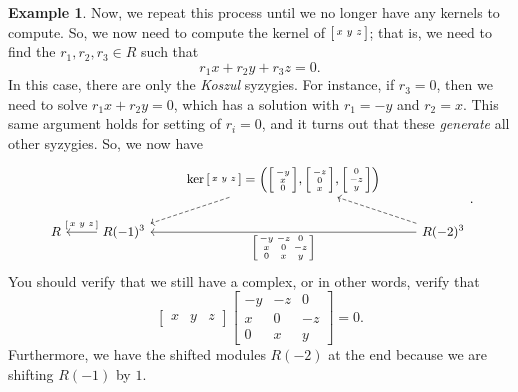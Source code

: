 \documentclass[12pt,a4paper]{article}
\theoremstyle{definition}
\newtheorem{example}[theorem]{Example}
\numberwithin{equation}{section}
\begin{document}
\begin{example}
    Now, we repeat this process until we no longer have any kernels to compute.
    So, we now need to compute the kernel of $\begin{bsmallmatrix} x & y & z \end{bsmallmatrix}$; that is, we need to find the $r_1, r_2, r_3 \in R$ such that
    \begin{equation*}
        r_1 x + r_2 y + r_3 z = 0.
    \end{equation*}
    In this case, there are only the \emph{Koszul} syzygies.
    For instance, if $r_3 = 0$, then we need to solve $r_1 x + r_2 y = 0$, which has a solution with $r_1 = -y$ and $r_2 = x$.
    This same argument holds for setting of $r_i = 0$, and it turns out that these \emph{generate} all other syzygies.
    So, we now have
    \begin{equation*}
    \small
    \begin{tikzcd}[ampersand replacement=\&]
        {} \& {} \& \ker{\begin{bsmallmatrix} x & y & z \end{bsmallmatrix} = \left( \begin{bsmallmatrix} -y \\ x \\ 0 \end{bsmallmatrix}, \begin{bsmallmatrix} -z \\ 0 \\ x \end{bsmallmatrix}, \begin{bsmallmatrix} 0 \\ -z \\ y \end{bsmallmatrix} \right)} \arrow[dl,dashed] \& {} \\
        R \& R(-1)^3 \arrow[l,swap,"{\begin{bsmallmatrix} x & y & z \end{bsmallmatrix}}"] \& {} \& R(-2)^3 \arrow[ll,"{\begin{bsmallmatrix} -y & -z & 0 \\ x & 0 & -z \\ 0 & x & y \end{bsmallmatrix}}"] \arrow[ul,dashed]
    \end{tikzcd}.
    \end{equation*}
    You should verify that we still have a complex, or in other words, verify that
    \begin{equation*}
        \begin{bmatrix}
            x & y & z
        \end{bmatrix}
        \begin{bmatrix}
            -y & -z & 0 \\ 
            x & 0 & -z \\ 
            0 & x & y 
        \end{bmatrix}
        = 0.
    \end{equation*}
    Furthermore, we have the shifted modules $R(-2)$ at the end because we are shifting \emph{$R(-1)$} by $1$.


\end{example}
\end{document}

